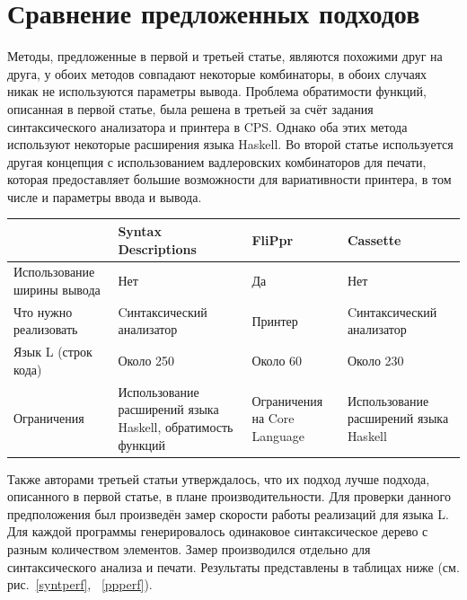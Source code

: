 \section{Сравнение предложенных подходов}

Методы, предложенные в первой и третьей статье, являются похожими друг на друга, 
у обоих методов совпадают некоторые комбинаторы, в обоих случаях никак не 
используются параметры вывода. Проблема обратимости функций, описанная в первой
статье, была решена в третьей за счёт задания синтаксического анализатора и принтера в CPS. 
Однако оба этих метода используют некоторые расширения языка Haskell. Во второй статье 
используется другая концепция с использованием вадлеровских комбинаторов для печати,
которая предоставляет большие возможности для вариативности принтера, в том числе и 
параметры ввода и вывода.

\begin{center}
  \begin{tabular}{ | p{2.5cm} | p{2.5cm} | p{2.5cm} | p{2.5cm} |}
  \hline
                              & Syntax Descriptions                                         & FliPpr                       & Cassette                              \\ \hline
  Использование ширины вывода & Нет                                                         & Да                           & Нет                                   \\ \hline
  Что нужно реализовать       & Cинтаксичес\-кий анализатор                                 & Принтер                      & Cинтаксичес\-кий анализатор           \\ \hline
  Язык L (строк кода)         & Около 250                                                   & Около 60                     & Около 230                             \\ \hline
  Ограничения                 & Использование расширений языка Haskell, обратимость функций & Ограничения на Core Language & Использование расширений языка Haskell\\
  \hline
  \end{tabular}
\end{center}

Также авторами третьей статьи утверждалось, что их подход лучше подхода, описанного в первой статье, 
в плане производительности. Для проверки данного предположения был произведён замер скорости 
работы реализаций для языка L. Для каждой программы генерировалось одинаковое синтаксическое 
дерево с разным количеством элементов. Замер производился отдельно для синтаксического анализа и 
печати. Результаты представлены в таблицах ниже (см. рис.~\ref{syntperf}, ~\ref{ppperf}).


